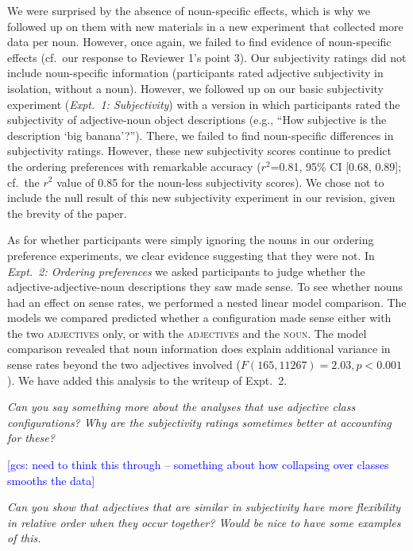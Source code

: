 \documentclass[12pt]{article}
\newcommand{\gcs}[1]{\textcolor{blue}{[gcs: #1]}}
\begin{document}
We were surprised by the absence of noun-specific effects, which is why we followed up on them with new materials in a new experiment that collected more data per noun. However, once again, we failed to find evidence of noun-specific effects (cf.~our response to Reviewer 1's point 3). Our subjectivity ratings did not include noun-specific information (participants rated adjective subjectivity in isolation, without a noun). However, we followed up on our basic subjectivity experiment (\emph{Expt.~1: Subjectivity}) with a version in which participants rated the subjectivity of adjective-noun object descriptions (e.g., ``How subjective is the description `big banana'?''). There, we failed to find noun-specific differences in subjectivity ratings. However, these new subjectivity scores continue to predict the ordering preferences with remarkable accuracy ($r^2${=}0.81, 95\% CI [0.68,  0.89]; cf.~the $r^2$ value of 0.85 for the noun-less subjectivity scores). We chose not to include the null result of this new subjectivity experiment in our revision, given the brevity of the paper.

As for whether participants were simply ignoring the nouns in our ordering preference experiments, we clear evidence suggesting that they were not. In \emph{Expt.~2: Ordering preferences} we asked participants to judge whether the adjective-adjective-noun descriptions they saw made sense. To see whether nouns had an effect on sense rates, we performed a nested linear model comparison. The models we compared predicted whether a configuration made sense either with the two \textsc{adjectives} only, or with the \textsc{adjectives} and the \textsc{noun}. The model comparison revealed that noun information does explain additional variance in sense rates beyond the two adjectives involved ($F(165,11267)=2.03, p<0.001$). We have added this analysis to the writeup of Expt.~2.


\item \emph{Can you say something more about the analyses that use adjective class configurations? Why are the subjectivity ratings sometimes better at accounting for these?}

\gcs{need to think this through -- something about how collapsing over classes smooths the data}

\item \emph{Can you show that adjectives that are similar in subjectivity have more flexibility in relative order when they occur together? Would be nice to have some examples of this.}
\end{document}
